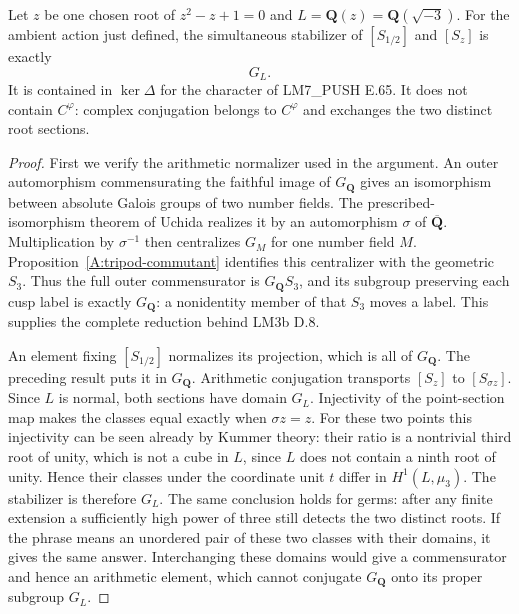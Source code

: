 \begin{proposition}
\label{A:two-section-stabilizer}
Let $z$ be one chosen root of $z^2-z+1=0$ and
$L=\mathbf Q(z)=\mathbf Q(\sqrt{-3})$.  For the
ambient action just defined, the simultaneous stabilizer
of $[S_{1/2}]$ and $[S_z]$ is exactly
\[
                         G_L.
\]
It is contained in $\ker\Delta$ for the character
of LM7\_PUSH E.65.  It does not contain $C^\varphi$:
complex conjugation belongs to $C^\varphi$ and
exchanges the two distinct root sections.
\end{proposition}
\begin{proof}
First we verify the arithmetic normalizer used in the
argument.  An outer automorphism commensurating the
faithful image of $G_{\mathbf Q}$ gives an isomorphism
between absolute Galois groups of two number fields.
The prescribed-isomorphism theorem of Uchida
\cite{A_Uchida1979} realizes it by an automorphism
$\sigma$ of $\overline{\mathbf Q}$.  Multiplication
by $\sigma^{-1}$ then centralizes $G_M$ for one
number field $M$.  Proposition~\ref{A:tripod-commutant}
identifies this centralizer with the geometric $S_3$.
Thus the full outer commensurator is
$G_{\mathbf Q}S_3$, and its subgroup preserving each
cusp label is exactly $G_{\mathbf Q}$: a nonidentity
member of that $S_3$ moves a label.  This supplies
the complete reduction behind LM3b D.8.

An element fixing $[S_{1/2}]$ normalizes its projection,
which is all of $G_{\mathbf Q}$.  The preceding result
puts it in $G_{\mathbf Q}$.  Arithmetic conjugation
transports $[S_z]$ to $[S_{\sigma z}]$.  Since $L$
is normal, both sections have domain $G_L$.
Injectivity of the point-section map makes the classes
equal exactly when $\sigma z=z$.  For these two
points this injectivity can be seen already by Kummer
theory: their ratio is a nontrivial third root of
unity, which is not a cube in $L$, since $L$ does
not contain a ninth root of unity.  Hence their
classes under the coordinate unit $t$ differ in
$H^1(L,\mu_3)$.  The stabilizer is therefore $G_L$.
The same conclusion holds for germs: after any finite
extension a sufficiently high power of three still
detects the two distinct roots.  If the phrase means
an unordered pair of these two classes with their
domains, it gives the same answer.  Interchanging
these domains would give a commensurator and hence
an arithmetic element, which cannot conjugate
$G_{\mathbf Q}$ onto its proper subgroup $G_L$.


\end{proof}
